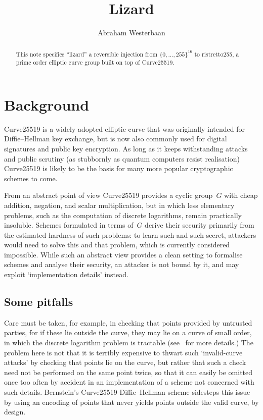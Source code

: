 \documentclass{amsproc}
\title{Lizard}
\author{Abraham Westerbaan}
\begin{document}
\maketitle
\begin{abstract}
This note specifies
``lizard''
a reversible injection from $\{0,\dotsc,255\}^{16}$
to ristretto255, a prime order elliptic curve group built 
    on top of Curve25519.
\end{abstract}

\section{Background}
Curve25519 is a widely adopted elliptic curve
that was originally intended\cite{x25519} for 
Diffie--Hellman key exchange,
but is now also commonly used for
digital signatures\cite{ed25519}
and public key encryption\cite{rfc6637}.
As long as it keeps withstanding attacks and public scrutiny
(as stubbornly as quantum computers resist realisation)
Curve25519 is likely to be the basis for many more popular
cryptographic schemes to come.

From an abstract point of view
Curve25519 provides a cyclic group~$G$
with cheap addition, negation, and scalar multiplication,
but in which less elementary problems, 
such as the computation of discrete logarithms,
remain practically insoluble.
Schemes formulated in terms of~$G$
derive their security primarily from 
the estimated hardness of such problems:
to learn such and such secret,
attackers would
need to solve
this and that problem,
which is currently considered impossible.
While such an abstract view
provides a clean setting 
to formalise schemes
and analyse their security,
an attacker is not bound by it,
and may exploit `implementation details' instead.

\subsection{Some pitfalls}
Care must be taken,
for example,
in checking that points provided by untrusted parties,
for if these lie outside the curve,
they may lie on a curve of small order,
in which the discrete logarithm problem is tractable
(see~\cite{invalidcurveattack,hmqvattack} for more details.)
The problem here is not that it
is terribly expensive to thwart such 
`invalid-curve attacks'
by checking that points lie on the curve,
but rather that such a check need not be performed on the same point twice,
so that it can easily be omitted once too often by accident
in an implementation of a scheme not concerned with such details.
Bernstein's Curve25519 Diffie--Hellman scheme sidesteps
this issue by using an encoding of points
that never yields points outside the valid curve,
by design.
\end{document}
